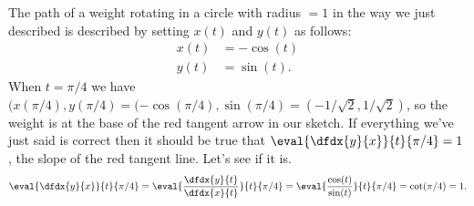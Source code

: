 \begin{myexample}
  The path of a weight rotating in a circle with radius $= 1$ in the
  way we just described is described by setting $x(t)$ and $y(t)$ as
  follows:
  \begin{align*}
    x(t)&=-\cos(t)\\
    y(t)&=\sin(t).
  \end{align*}
  When $t=\pi/4$ we have $(x(\pi/4), y(\pi/4) =
  (-\cos(\pi/4),\sin(\pi/4) = (-1/\sqrt{2},1/\sqrt{2})$, so the weight
  is at the base of the red tangent arrow in our sketch. If everything
  we've just said is correct then it should be true that
  $
  \eval{\dfdx{y}{x}}{t}{\pi/4} = 1
  $, the slope of the red tangent line.  Let's see if it is.
  $$
  \eval{\dfdx{y}{x}}{t}{\pi/4}=\eval{\frac{\dfdx{y}{t}}{\dfdx{x}{t}}}{t}{\pi/4}=\eval{\frac{\cos(t)}{\sin(t)}}{t}{\pi/4}=\cot(\pi/4)=1.
  $$
\end{myexample}
